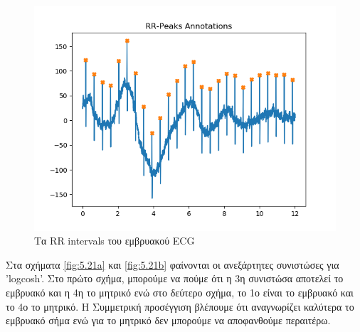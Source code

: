 \begin{figure}[H]
    \centering
    \includegraphics[width=0.7 \textwidth]{r01database/RR_peaks_annotations.png}
    \caption{Τα \en RR intervals \gr του εμβρυακού \en ECG \gr}
    \label{fig:5.20}
\end{figure}
\noindent Στα σχήματα \en \ref{fig:5.21a} \gr και \en \ref{fig:5.21b} \gr φαίνονται οι ανεξάρτητες συνιστώσες για \en 'logcosh'. \gr Στο πρώτο σχήμα, μπορούμε να πούμε ότι η 3η συνιστώσα αποτελεί το εμβρυακό και η 4η το μητρικό ενώ στο δεύτερο σχήμα, το 1ο είναι το εμβρυακό και το 4ο το μητρικό. Η Συμμετρική προσέγγιση βλέπουμε ότι αναγνωρίζει καλύτερα το εμβρυακό σήμα ενώ για το μητρικό δεν μπορούμε να αποφανθούμε περαιτέρω.
